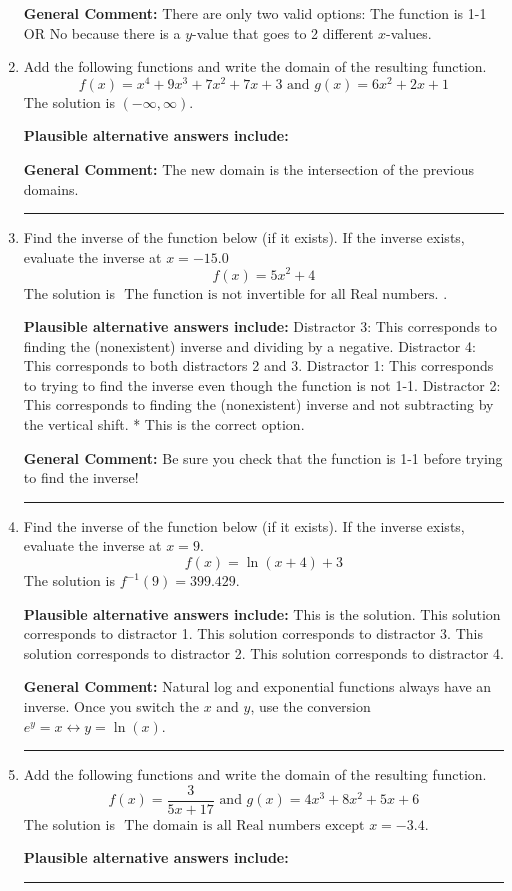 \documentclass{extbook}[14pt]
\newcommand{\litem}[1]{\item #1

\rule{\textwidth}{0.4pt}}
\begin{document}
\begin{enumerate}
{\textbf{General Comment:} There are only two valid options: The function is 1-1 OR No because there is a $y$-value that goes to 2 different $x$-values.
}
\litem{
Add the following functions and write the domain of the resulting function.
\[ f(x) = x^{4} +9 x^{3} +7 x^{2} +7 x + 3 \text{ and } g(x) = 6x^{2} +2 x + 1 \]The solution is \( (-\infty, \infty) \).\begin{enumerate}[label=\Alph*.]
\textbf{Plausible alternative answers include:}




\end{enumerate}

\textbf{General Comment:} The new domain is the intersection of the previous domains.
}
\litem{
Find the inverse of the function below (if it exists). If the inverse exists, evaluate the inverse at $x = -15.0$
\[ f(x) = 5 x^2 + 4 \]The solution is \( \text{ The function is not invertible for all Real numbers. } \).\begin{enumerate}[label=\Alph*.]
\textbf{Plausible alternative answers include:} Distractor 3: This corresponds to finding the (nonexistent) inverse and dividing by a negative.
 Distractor 4: This corresponds to both distractors 2 and 3.
 Distractor 1: This corresponds to trying to find the inverse even though the function is not 1-1. 
 Distractor 2: This corresponds to finding the (nonexistent) inverse and not subtracting by the vertical shift.
* This is the correct option.
\end{enumerate}

\textbf{General Comment:} Be sure you check that the function is 1-1 before trying to find the inverse!
}
\litem{
Find the inverse of the function below (if it exists). If the inverse exists, evaluate the inverse at $x = 9$.
\[ f(x) = \ln{(x+4)}+3 \]The solution is \( f^{-1}(9) = 399.429 \).\begin{enumerate}[label=\Alph*.]
\textbf{Plausible alternative answers include:} This is the solution.
 This solution corresponds to distractor 1.
 This solution corresponds to distractor 3.
 This solution corresponds to distractor 2.
 This solution corresponds to distractor 4.
\end{enumerate}

\textbf{General Comment:} Natural log and exponential functions always have an inverse. Once you switch the $x$ and $y$, use the conversion $ e^y = x \leftrightarrow y=\ln(x)$.
}
\litem{
Add the following functions and write the domain of the resulting function.
\[ f(x) = \frac{3}{5x+17} \text{ and } g(x) = 4x^{3} +8 x^{2} +5 x + 6 \]The solution is \( \text{ The domain is all Real numbers except } x = -3.4 \).\begin{enumerate}[label=\Alph*.]
\textbf{Plausible alternative answers include:}





\end{enumerate}}
\end{enumerate}
\end{document}
